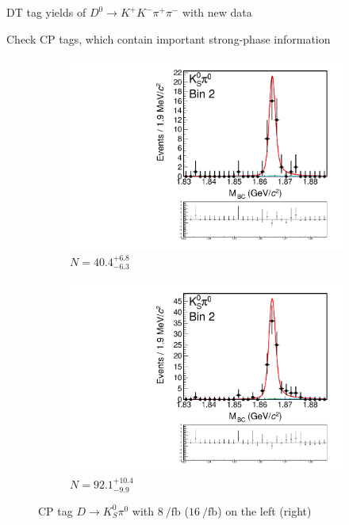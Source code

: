 \documentclass{beamer}
\begin{document}
\begin{frame}{DT tag yields of $D^0\to K^+K^-\pi^+\pi^-$ with new data}
  \begin{center}
    {\large Check CP tags, which contain important strong-phase information}
  \end{center}
  \vspace{0.1cm}
  \begin{figure}
    \centering
    \begin{subfigure}{0.45\textwidth}
      \includegraphics[width = 1.0\textwidth,trim={0 4.9cm 0 0},clip=true]{Plots/DoubleTagYield_DoubleTag_CP_KKpipi_vs_KSpi0_SignalBin2_8invfb.pdf}
      \caption{$N = 40.4^{+6.8}_{-6.3}$}
    \end{subfigure}%
    \hspace{1cm}
    \begin{subfigure}{0.45\textwidth}
      \includegraphics[width = 1.0\textwidth,trim={0 4.9cm 0 0},clip=true]{Plots/DoubleTagYield_DoubleTag_CP_KKpipi_vs_KSpi0_SignalBin2_16invfb.pdf}
      \caption{$N = 92.1^{+10.4}_{-9.9}$}
    \end{subfigure}
    \caption{CP tag $D\to K_S^0\pi^0$ with $\SI{8}{\per\femto\barn}$ ($\SI{16}{\per\femto\barn}$) on the left (right)}
  \end{figure}
\end{frame}
\end{document}
